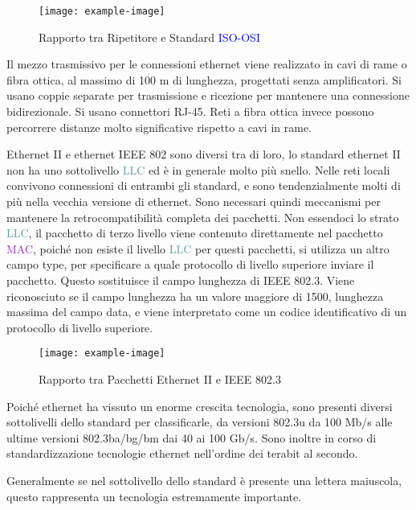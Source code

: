 \documentclass{article}
\numberwithin{equation}{subsection}
\begin{document}
\begin{figure}[H]%
    \centering%
    \texttt{[image: example-image]}%
    \caption{Rapporto tra Ripetitore e Standard \textcolor{blue}{ISO-OSI}}%
\end{figure}

Il mezzo trasmissivo per le connessioni ethernet viene realizzato in cavi di rame o fibra ottica, al massimo di 100 m di lunghezza, progettati senza amplificatori. Si usano coppie separate per trasmissione e 
ricezione per mantenere una connessione bidirezionale. Si usano connettori RJ-45. Reti a fibra ottica invece possono percorrere distanze molto significative rispetto a cavi in rame. 

Ethernet II e ethernet IEEE 802 sono diversi tra di loro, lo standard ethernet II non ha uno sottolivello \textcolor{CadetBlue}{LLC} ed è in generale molto più snello. Nelle reti locali convivono connessioni di entrambi gli standard, e 
sono tendenzialmente molti di più nella vecchia versione di ethernet. Sono necessari quindi meccanismi per mantenere la retrocompatibilità completa dei pacchetti. 
Non essendoci lo strato \textcolor{CadetBlue}{LLC}, il pacchetto di terzo livello viene contenuto direttamente nel pacchetto \textcolor{DarkOrchid}{MAC}, poiché non esiste il livello \textcolor{CadetBlue}{LLC} per questi pacchetti, si utilizza un altro campo type, per specificare a 
quale protocollo di livello superiore inviare il pacchetto. Questo sostituisce il campo lunghezza di IEEE 802.3. Viene riconosciuto se il campo lunghezza ha un valore maggiore di 1500, lunghezza massima del campo 
data, e viene interpretato come un codice identificativo di un protocollo di livello superiore. 

\begin{figure}[H]%
    \centering%
    \texttt{[image: example-image]}%
    \caption{Rapporto tra Pacchetti Ethernet II e IEEE 802.3}%
\end{figure}

Poiché ethernet ha vissuto un enorme crescita tecnologia, sono presenti diversi sottolivelli dello standard per classificarle, da versioni 802.3u da 100 Mb/s alle ultime versioni 802.3ba/bg/bm dai 40 ai 100 
Gb/s. Sono inoltre in corso di standardizzazione tecnologie ethernet nell'ordine dei terabit al secondo.  

Generalmente se nel sottolivello dello standard è presente una lettera maiuscola, questo rappresenta un tecnologia estremamente importante. 
\end{document}
